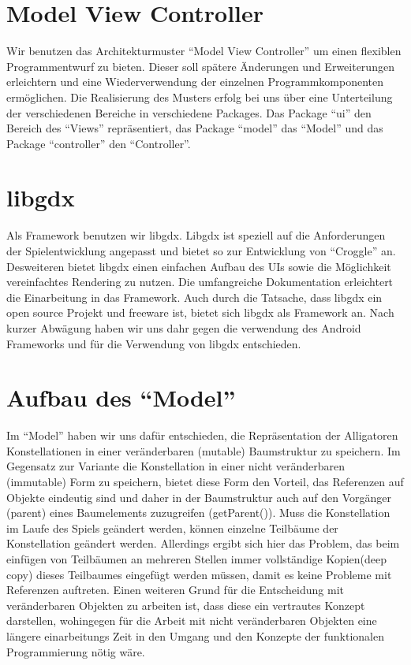 \section{Model View Controller}
Wir benutzen das Architekturmuster "`Model View Controller"' um einen flexiblen Programmentwurf zu bieten.
Dieser soll spätere Änderungen und Erweiterungen erleichtern und eine Wiederverwendung der einzelnen 
Programmkomponenten ermöglichen.
Die Realisierung des Musters erfolg bei uns über eine Unterteilung der verschiedenen Bereiche in verschiedene Packages. Das Package "`ui"' den Bereich des "`Views"' repräsentiert, das Package
 "`model"' das "`Model"' und das Package "`controller"' den "`Controller"'.

\section{libgdx}
Als Framework benutzen wir libgdx. Libgdx ist speziell auf die Anforderungen der Spielentwicklung angepasst
und bietet so zur Entwicklung von "`Croggle"' an. Desweiteren bietet libgdx einen einfachen Aufbau des UIs sowie die Möglichkeit vereinfachtes Rendering zu nutzen. Die umfangreiche Dokumentation erleichtert die
Einarbeitung in das Framework. Auch durch die Tatsache, dass libgdx ein open source Projekt und freeware ist, bietet sich libgdx als Framework an. Nach kurzer Abwägung haben wir uns dahr gegen die verwendung des Android Frameworks und für die Verwendung von libgdx entschieden.

\section{Aufbau des "`Model"'}
Im "`Model"' haben wir uns dafür entschieden, die Repräsentation der Alligatoren Konstellationen in einer 
veränderbaren (mutable) Baumstruktur zu speichern. Im Gegensatz zur Variante die Konstellation in einer nicht veränderbaren (immutable) Form zu speichern, bietet diese Form den Vorteil, das Referenzen auf Objekte eindeutig sind und daher in der Baumstruktur auch auf den Vorgänger (parent) eines Baumelements zuzugreifen (getParent()). Muss die Konstellation im Laufe des Spiels geändert werden, können einzelne Teilbäume der Konstellation geändert werden. Allerdings ergibt sich hier das Problem, das beim einfügen von Teilbäumen an mehreren Stellen immer vollständige Kopien(deep copy) dieses Teilbaumes eingefügt werden müssen, damit es keine Probleme mit Referenzen auftreten.
Einen weiteren Grund für die Entscheidung mit veränderbaren Objekten zu arbeiten ist, dass diese ein vertrautes Konzept darstellen, wohingegen für die Arbeit mit nicht veränderbaren Objekten eine längere einarbeitungs Zeit in den Umgang und den Konzepte der funktionalen Programmierung nötig wäre. 

